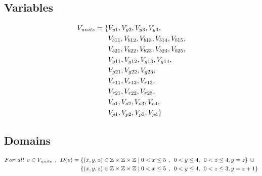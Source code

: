 \subsection{Variables}
\begin{align*}
V_{units}=\{&V_{y1},V_{y2},V_{y3},V_{y4},\\&V_{b11},V_{b12},V_{b13},V_{b14},
V_{b15},\\&V_{b21},V_{b22},V_{b23},V_{b24},V_{b25},\\&V_{g11},V_{g12},V_{g13},V_{g14},\\&V_{g21},V_{g22},V_{g23},\\&V_{r11},
V_{r12},V_{r13},\\&V_{r21},V_{r22},V_{r23},\\&V_{o1},V_{o2},V_{o3},V_{o4},\\&V_{p1},V_{p2},V_{p3},V_{p4}\}
\end{align*}
\subsection{Domains}
\begin{align*}
For \hspace{1ex} all \hspace{1ex} v \in V_{units} \hspace{1ex},\hspace{1ex} D(v)=\{&(x,y,z) \in \mathbb{Z} \times \mathbb{Z}	\times \mathbb{Z} \mid  0<x \leq 5 \hspace{1ex} , \hspace{1ex} 0<y \leq 4,\hspace{1ex} 0<z \leq 4,y=z\} \hspace{1ex}\cup\\
\{&(x,y,z) \in \mathbb{Z} \times \mathbb{Z}	\times \mathbb{Z} \mid  0<x \leq 5 \hspace{1ex} , \hspace{1ex} 0<y \leq 4,\hspace{1ex} 0<z \leq 3,y=z+1\}
\end{align*}